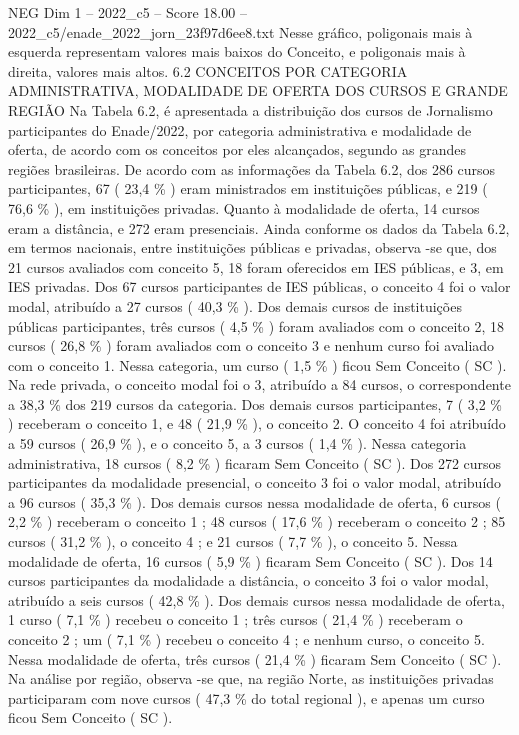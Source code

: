 \begin{textsample}{NEG Dim 1 – 2022\_c5 – Score 18.00 – 2022\_c5/enade\_2022\_jorn\_23f97d6ee8.txt}
Nesse gráfico, poligonais mais à esquerda representam valores mais baixos do Conceito, e poligonais mais à direita, valores mais altos. 6.2 CONCEITOS POR CATEGORIA ADMINISTRATIVA, MODALIDADE DE OFERTA DOS CURSOS E GRANDE REGIÃO Na Tabela 6.2, é apresentada a distribuição dos cursos de Jornalismo participantes do Enade/2022, por categoria administrativa e modalidade de oferta, de acordo com os conceitos por eles alcançados, segundo as grandes regiões brasileiras.
De acordo com as informações da Tabela 6.2, dos 286 cursos participantes, 67 ( 23,4 \% ) eram ministrados em instituições públicas, e 219 ( 76,6 \% ), em instituições privadas.
Quanto à modalidade de oferta, 14 cursos eram a distância, e 272 eram presenciais.
Ainda conforme os dados da Tabela 6.2, em termos nacionais, entre instituições públicas e privadas, observa -se que, dos 21 cursos avaliados com conceito 5, 18 foram oferecidos em IES públicas, e 3, em IES privadas.
Dos 67 cursos participantes de IES públicas, o conceito 4 foi o valor modal, atribuído a 27 cursos ( 40,3 \% ).
Dos demais cursos de instituições públicas participantes, três cursos ( 4,5 \% ) foram avaliados com o conceito 2, 18 cursos ( 26,8 \% ) foram avaliados com o conceito 3 e nenhum curso foi avaliado com o conceito 1.
Nessa categoria, um curso ( 1,5 \% ) ficou Sem Conceito ( SC ).
Na rede privada, o conceito modal foi o 3, atribuído a 84 cursos, o correspondente a 38,3 \% dos 219 cursos da categoria.
Dos demais cursos participantes, 7 ( 3,2 \% ) receberam o conceito 1, e 48 ( 21,9 \% ), o conceito 2.
O conceito 4 foi atribuído a 59 cursos ( 26,9 \% ), e o conceito 5, a 3 cursos ( 1,4 \% ).
Nessa categoria administrativa, 18 cursos ( 8,2 \% ) ficaram Sem Conceito ( SC ).
Dos 272 cursos participantes da modalidade presencial, o conceito 3 foi o valor modal, atribuído a 96 cursos ( 35,3 \% ).
Dos demais cursos nessa modalidade de oferta, 6 cursos ( 2,2 \% ) receberam o conceito 1 ; 48 cursos ( 17,6 \% ) receberam o conceito 2 ; 85 cursos ( 31,2 \% ), o conceito 4 ; e 21 cursos ( 7,7 \% ), o conceito 5.
Nessa modalidade de oferta, 16 cursos ( 5,9 \% ) ficaram Sem Conceito ( SC ).
Dos 14 cursos participantes da modalidade a distância, o conceito 3 foi o valor modal, atribuído a seis cursos ( 42,8 \% ).
Dos demais cursos nessa modalidade de oferta, 1 curso ( 7,1 \% ) recebeu o conceito 1 ; três cursos ( 21,4 \% ) receberam o conceito 2 ; um ( 7,1 \% ) recebeu o conceito 4 ; e nenhum curso, o conceito 5.
Nessa modalidade de oferta, três cursos ( 21,4 \% ) ficaram Sem Conceito ( SC ).
Na análise por região, observa -se que, na região Norte, as instituições privadas participaram com nove cursos ( 47,3 \% do total regional ), e apenas um curso ficou Sem Conceito ( SC ).

\end{textsample}
